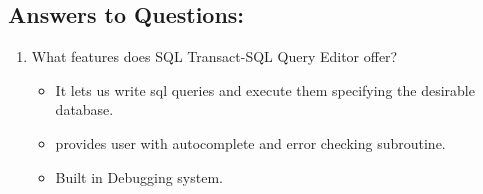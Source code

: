 \documentclass[12pt]{article}
\begin{document}
        \subsection*{Answers to Questions:}
        \begin{enumerate}
                \item What features does SQL Transact-SQL Query Editor offer?
                \begin{itemize}
                        
                        \item It lets us write sql queries and execute them specifying the desirable database.
                        \item provides user with autocomplete and error checking subroutine.
                        \item Built in Debugging system.


\end{itemize}
\end{enumerate}
\end{document}

